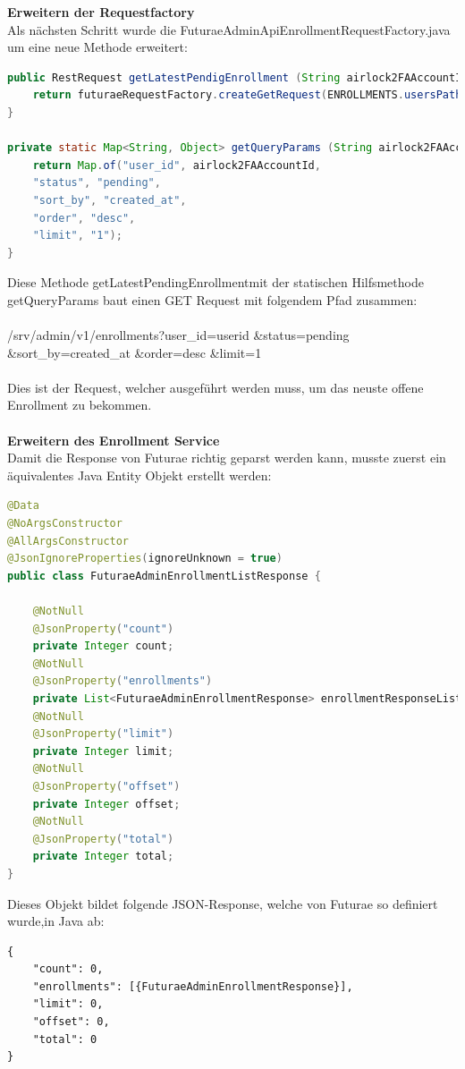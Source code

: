 \textbf{Erweitern der Requestfactory}\\
Als nächsten Schritt wurde die FuturaeAdminApiEnrollmentRequestFactory.java um eine neue Methode erweitert:
\begin{lstlisting}[language=Java]
public RestRequest getLatestPendigEnrollment (String airlock2FAAccountId) {
	return futuraeRequestFactory.createGetRequest(ENROLLMENTS.usersPath(), getQueryParams(airlock2FAAccountId));
}

private static Map<String, Object> getQueryParams (String airlock2FAAccountId) {
	return Map.of("user_id", airlock2FAAccountId,
	"status", "pending",
	"sort_by", "created_at",
	"order", "desc",
	"limit", "1");
}
\end{lstlisting}
Diese Methode \flqq getLatestPendingEnrollment\frqq mit der statischen Hilfsmethode \flqq getQueryParams \frqq baut einen GET Request mit folgendem Pfad zusammen:\\\\
/srv/admin/v1/enrollments?user\_id={userid}
\newline\&status=pending 
\newline\&sort\_by=created\_at 
\newline\&order=desc
\newline\&limit=1\\\\
Dies ist der Request, welcher ausgeführt werden muss, um das neuste offene Enrollment zu bekommen.\\\\
\textbf{Erweitern des Enrollment Service}\\
Damit die Response von Futurae richtig geparst werden kann, musste zuerst ein äquivalentes Java Entity Objekt erstellt werden:
\begin{lstlisting}[language=Java]
@Data
@NoArgsConstructor
@AllArgsConstructor
@JsonIgnoreProperties(ignoreUnknown = true)
public class FuturaeAdminEnrollmentListResponse {
	
	@NotNull
	@JsonProperty("count")
	private Integer count;
	@NotNull
	@JsonProperty("enrollments")
	private List<FuturaeAdminEnrollmentResponse> enrollmentResponseList;
	@NotNull
	@JsonProperty("limit")
	private Integer limit;
	@NotNull
	@JsonProperty("offset")
	private Integer offset;
	@NotNull
	@JsonProperty("total")
	private Integer total;
}
\end{lstlisting}
Dieses Objekt bildet folgende JSON-Response, welche von Futurae so definiert wurde,in Java ab:
\begin{verbatim}
{
	"count": 0,
	"enrollments": [{FuturaeAdminEnrollmentResponse}],
	"limit": 0,
	"offset": 0,
	"total": 0
}
\end{verbatim}
